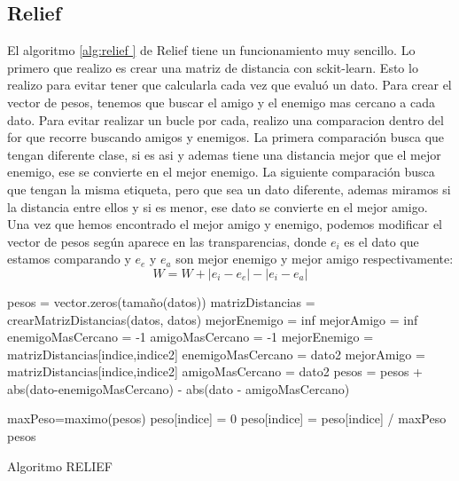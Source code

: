 \documentclass[12pt,a4paper]{article}
\begin{document}
\subsection{Relief}
El algoritmo \ref{alg:relief } de Relief tiene un funcionamiento muy sencillo. Lo primero que realizo es crear una matriz de distancia con sckit-learn\cite{Baz}. Esto lo realizo para  evitar tener que calcularla cada vez que evaluó un dato. Para crear el vector de pesos, tenemos que buscar el amigo y el enemigo mas cercano a cada dato. Para evitar realizar un bucle por cada, realizo una comparacion dentro del for que recorre buscando amigos y enemigos. La primera comparación busca que tengan diferente clase, si es asi y ademas tiene una distancia mejor que el mejor enemigo, ese se convierte en el mejor enemigo. La siguiente comparación busca que tengan la misma etiqueta, pero que sea un dato diferente, ademas miramos si la distancia entre ellos  y si es menor, ese dato se convierte en el mejor amigo.\\
Una vez que hemos encontrado el mejor amigo y enemigo, podemos modificar el vector de pesos según aparece en las transparencias, donde $e_i$ es el dato que estamos comparando y $e_e$ y $e_a$ son mejor enemigo y mejor amigo respectivamente:
\[ W=W+\left|e_{i}-e_{e}\right|-\left|e_{i}-e_{a}\right| \]
\begin{algorithm}[H]
	\begin{algorithmic}[1]
		\State 	pesos = vector.zeros(tamaño(datos))
		\State matrizDistancias = crearMatrizDistancias(datos, datos)
			\State mejorEnemigo = inf
			\State mejorAmigo = inf
			\State enemigoMasCercano = -1
			\State amigoMasCercano = -1
						\State mejorEnemigo = matrizDistancias[indice,indice2]
						\State enemigoMasCercano = dato2
					\EndIf %
				\EndIf %
						\State mejorAmigo = matrizDistancias[indice,indice2]
						\State amigoMasCercano = dato2
					\EndIf %
				\EndIf %
			\EndFor
			\State pesos = pesos + abs(dato-enemigoMasCercano) - abs(dato - amigoMasCercano)
			
		\EndFor
		\State maxPeso=maximo(pesos)
				\State peso[indice] = 0
			\Else
				\State peso[indice] = peso[indice] / maxPeso
			\EndIf
		\EndFor
		\State \Return pesos
		
	\end{algorithmic}
	\label{alg:relief}
	\caption{Algoritmo RELIEF}
\end{algorithm}
\end{document}
